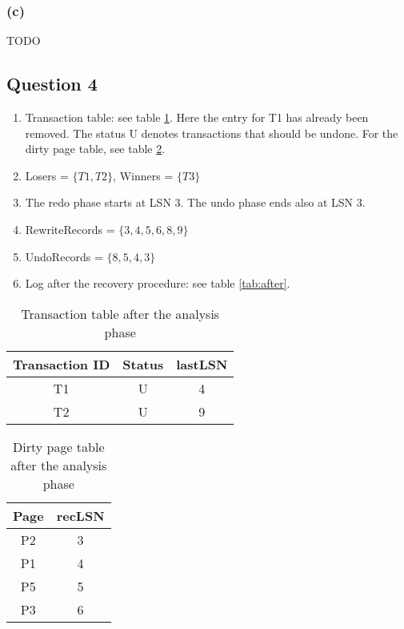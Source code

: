 \documentclass[12pt,a4paper]{article}
\begin{document}
\subsubsection*{(c)}
TODO


\subsection*{Question 4}
\label{sec:eq4}

\begin{enumerate}
  \item Transaction table: see table \ref{tab:transactions}. Here the entry for T1 has already been removed. The status U denotes transactions that should be undone. For the dirty page table, see table \ref{tab:dirty}.
  \item Losers = $\{T1, T2\}$, Winners = $\{T3\}$
  \item The redo phase starts at LSN 3. The undo phase ends also at LSN 3. 
  \item RewriteRecords = $\{3,4,5,6,8,9\}$
  \item UndoRecords = $\{8,5,4,3\}$
  \item Log after the recovery procedure: see table \ref{tab:after}.
\end{enumerate}

\begin{table}
  \centering
  \begin{tabular}{c | c | c}
  Transaction ID & Status & lastLSN \\ \hline
  T1 & U & 4\\
  T2 & U & 9 
  \end{tabular}
  \caption{Transaction table after the analysis phase}
  \label{tab:transactions}
\end{table}

\begin{table}
  \centering
  \begin{tabular}{c|c}
  Page & recLSN \\ \hline
  P2 & 3 \\
  P1 & 4 \\
  P5 & 5 \\
  P3 & 6 
  \end{tabular}
  \caption{Dirty page table after the analysis phase}
  \label{tab:dirty}
\end{table}
\end{document}
